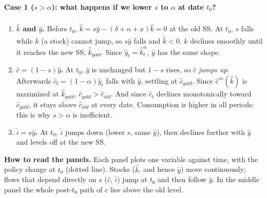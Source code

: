 \paragraph{Case 1 ($s>\alpha$): what happens if we lower $s$ to $\alpha$ at date $t_0$?}
\begin{enumerate}
  \item \textbf{$\hat k$ and $\hat y$.} Before $t_0$, $\dot{\hat k}=s\hat y-(\delta+n+x)\hat k=0$ at the old SS. At $t_0$, $s$ falls while $\hat k$ (a stock) cannot jump, so $s\hat y$ falls and $\dot{\hat k}<0$. $\hat k$ declines smoothly until it reaches the new SS, $\hat k_{gold}$. Since $\hat y_t=\hat k_t^{\alpha}$, $\hat y$ has the same shape.
  \item \textbf{$\hat c=(1-s)\hat y$.} At $t_0$, $\hat y$ is unchanged but $1-s$ rises, so $\hat c$ \emph{jumps up}. Afterwards $\hat c_t=(1-\alpha)\hat y_t$ falls with $\hat y$, settling at $\hat c_{gold}$. Since $\hat c^{ss}(\hat k)$ is maximized at $\hat k_{gold}$, $\hat c_{gold}>\hat c_{old}$. And since $\hat c_t$ declines monotonically toward $\hat c_{gold}$, it stays above $\hat c_{old}$ at every date. Consumption is higher in all periods: this is why $s>\alpha$ is inefficient.
  \item \textbf{$\hat i=s\hat y$.} At $t_0$, $\hat i$ jumps down (lower $s$, same $\hat y$), then declines further with $\hat y$ and levels off at the new SS.
\end{enumerate}
\begin{center}
\end{center}
\textbf{How to read the panels.} Each panel plots one variable against time, with the policy change at $t_0$ (dotted line). Stocks ($\hat k$, and hence $\hat y$) move continuously; flows that depend directly on $s$ ($\hat c$, $\hat i$) jump at $t_0$ and then follow $\hat y$. In the middle panel the whole post-$t_0$ path of $\hat c$ lies above the old level.

